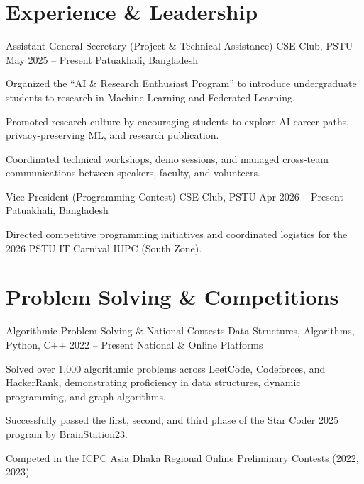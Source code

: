 \documentclass[11pt, a4paper]{article}
\begin{document}
\section{Experience \& Leadership}
\cvExperience
    {Assistant General Secretary (Project \& Technical Assistance)}
    {CSE Club, PSTU}
    {May 2025 – Present}
    {Patuakhali, Bangladesh}
    {
        \item Organized the ``AI \& Research Enthusiast Program'' to introduce undergraduate students to research in Machine Learning and Federated Learning.
        \item Promoted research culture by encouraging students to explore AI career paths, privacy-preserving ML, and research publication.
        \item Coordinated technical workshops, demo sessions, and managed cross-team communications between speakers, faculty, and volunteers.
    }

\cvExperience
    {Vice President (Programming Contest)}
    {CSE Club, PSTU}
    {Apr 2026 – Present}
    {Patuakhali, Bangladesh}
    {
        \item Directed competitive programming initiatives and coordinated logistics for the 2026 PSTU IT Carnival IUPC (South Zone).
    }

\section{Problem Solving \& Competitions}
\cvProject
    {Algorithmic Problem Solving \& National Contests}
    {Data Structures, Algorithms, Python, C++}
    {2022 – Present}
    {National \& Online Platforms}
    {
        \item Solved over 1,000 algorithmic problems across LeetCode, Codeforces, and HackerRank, demonstrating proficiency in data structures, dynamic programming, and graph algorithms.
        \item Successfully passed the first, second, and third phase of the Star Coder 2025 program by BrainStation23.
        \item Competed in the ICPC Asia Dhaka Regional Online Preliminary Contests (2022, 2023).
    }
\end{document}
